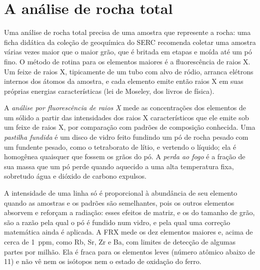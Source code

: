 
\section{A análise de rocha total}\label{sec:b2:field-lab-methods-2:whole-rock}

Uma análise de rocha total precisa de uma amostra que represente a rocha: uma ficha didática da coleção de
geoquímica do SERC recomenda coletar uma amostra várias vezes maior que o maior grão,
que é britada em etapas e moída até um pó fino. O método de rotina para os elementos maiores é a
fluorescência de raios X. Um feixe de raios X, tipicamente de um tubo com alvo de ródio, arranca elétrons
internos dos átomos da amostra, e cada elemento emite então raios X em suas próprias
energias características (lei de Moseley, dos livros de física).

\begin{definition}\label{def:b2:field-lab-methods-2:xrf}
A \emph{análise por fluorescência de raios X} mede as concentrações
dos elementos de um sólido a partir das intensidades dos raios X característicos que ele emite sob um
feixe de raios X, por comparação com padrões de composição conhecida. Uma \emph{pastilha
fundida} é um disco de vidro feito fundindo um pó de rocha pesado com um fundente pesado,
como o tetraborato de lítio, e vertendo o líquido; ela é homogênea quaisquer que fossem os grãos do
pó. A \emph{perda ao fogo} é a fração de sua massa que
um pó perde quando aquecido a uma alta temperatura fixa, sobretudo água e dióxido de carbono expulsos.
\end{definition}

A intensidade de uma linha só é proporcional à abundância de seu elemento quando as amostras e
os padrões são semelhantes, pois os outros elementos absorvem e reforçam a radiação: esses efeitos de
matriz, e os do tamanho de grão, são a razão pela qual o pó é fundido num vidro, e pela qual uma correção
matemática ainda é aplicada. A FRX mede os dez elementos maiores e, acima de cerca de \qty{1}{ppm},
 como Rb, Sr, Zr e Ba, com limites de detecção de algumas partes por milhão. Ela é
fraca para os elementos leves (número atômico abaixo de 11) e não vê nem os isótopos nem o estado de oxidação
do ferro.

